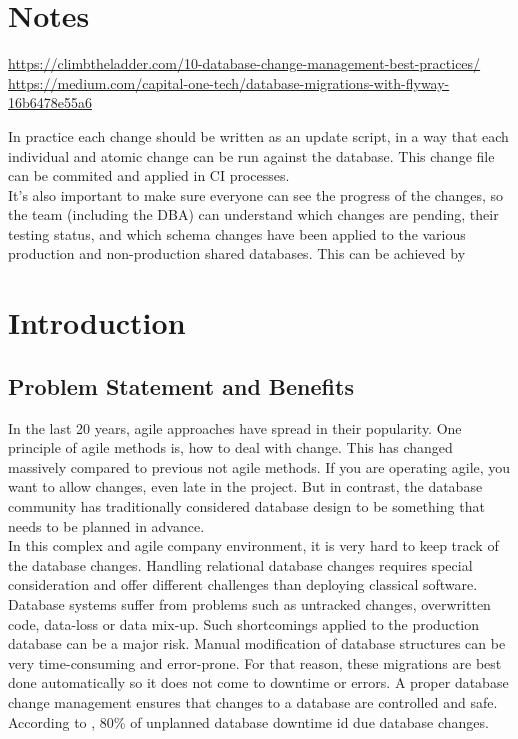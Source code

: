 


\chapter{Notes}


\url{https://climbtheladder.com/10-database-change-management-best-practices/}
\url{https://medium.com/capital-one-tech/database-migrations-with-flyway-16b6478e55a6}


In practice each change should be written as an update script, in a way that each individual and atomic change can be run against the database. This change file can be commited and applied in CI processes.\\

It's also important to make sure everyone can see the progress of the changes, so the team (including the DBA) can understand which changes are pending, their testing status, and which schema changes have been applied to the various production and non-production shared databases. This can be achieved by\\

\chapter{Introduction}


\section{Problem Statement and Benefits}%
 
 In the last 20 years, agile approaches have spread in their popularity. One principle of agile methods is, how to deal with change. This has changed massively compared to previous not agile methods. If you are operating agile, you want to allow changes, even late in the project. But in contrast, the database community has traditionally considered database design to be something that needs to be planned in advance.\\
 In this complex and agile company environment, it is very hard to keep track of the database changes. Handling relational database changes requires special consideration and offer different challenges than deploying classical software. Database systems suffer from problems such as untracked changes, overwritten code, data-loss or data mix-up. Such shortcomings applied to the production database can be a major risk.  Manual modification of database structures can be very time-consuming and error-prone.
 For that reason, these migrations are best done automatically so it does not come to downtime or errors. A proper database change management ensures that changes to a database are controlled and safe. According to \cite{ManageForce2016}, 80\% of unplanned database downtime id due database changes.

